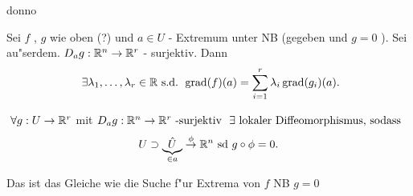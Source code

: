 \documentclass[class=article, crop=false]{standalone}
\begin{document}
\begin{zettel}{donno}
\begin{flashcard}{}
	\begin{theorem}
		Sei $f$ , $g$ wie oben (?) und $a \in  U$ - Extremum unter NB (gegeben und $g = 0$ ). Sei au"serdem. $D_a g : \mathbb{R}^n \to  \mathbb{R}^r$ - surjektiv. Dann
		\[
			\exists  \lambda_1,\dots,\lambda_r \in  \R \tx{s.d.} \grad(f)(a) = \sum_{i =1}^{r} \lambda_i \grad (g_i)(a)
		.\]
	\end{theorem}
\end{flashcard}

$ \forall  g : U \to  \R^r $ mit $ D_a g : \R^n \to  \R^r \tx{-surjektiv} \exists \tx{lokaler Diffeomorphismus, sodass} $
\[
	U \supset \underbrace{\hat{U}}_{\in  a} \stackrel{\phi}{\to} \mathbb{R}^n \text{ sd } g \circ  \phi = 0
.\]
\begin{remark}
	Das ist das Gleiche wie die Suche f"ur Extrema von $f$ NB $g = 0$
\end{remark}

%
%
\end{zettel}
\end{document}
